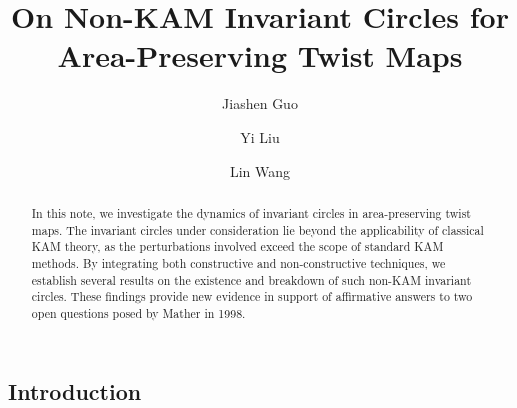 \documentclass{amsart}
\theoremstyle{definition}
\begin{document}
	\begin{CJK*}{GBK}{kai}
		
		\title[Non-KAM Invariant Circles for Area-Preserving Twist Maps]{  On Non-KAM Invariant Circles for Area-Preserving Twist Maps}
		
        \author{Jiashen Guo}
		\address{School of Mathematics and Statistics, Beijing Institute of Technology, Beijing 100081, China}

		\author{Yi Liu}
		\address{School of Mathematics and Statistics, Beijing Institute of Technology, Beijing 100081, China}
		
		\author{Lin Wang}
		\address{School of Mathematics and Statistics, Beijing Institute of Technology, Beijing 100081, China}
		
		
		
		
		
		\begin{abstract}
					 In this note, we investigate the dynamics of invariant circles in area-preserving twist maps. The invariant circles under consideration lie beyond the applicability of classical KAM theory, as the perturbations involved exceed the scope of standard KAM methods. By integrating both constructive and non-constructive techniques, we establish several results on the existence and breakdown of such non-KAM invariant circles. These findings provide new evidence in support of affirmative answers to two open questions posed by Mather in 1998.
		\end{abstract}
		
		
		
		\maketitle
		
		
		
		\tableofcontents
		\section{\sc Introduction}
		
		
		


\end{CJK*}
\end{document}
